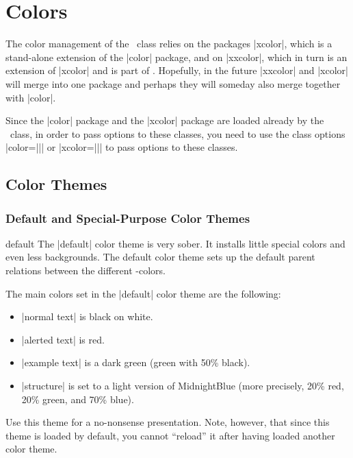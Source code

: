 %

\section{Colors}

\label{section-colors}


The color management of the \beamer\ class relies on the packages
|xcolor|, which is a stand-alone extension of the |color| package, 
and on |xxcolor|, which in turn is an extension of
|xcolor| and is part of \pgf. Hopefully, in the future |xxcolor| and
|xcolor| will merge into one package and perhaps they will
someday also merge together with |color|.

Since the |color| package and the |xcolor| package are loaded already
by the \beamer\ class, in order to pass options to these classes, you
need to use the class options |color={||}| or
|xcolor={||}| to pass options to these
classes.




\subsection{Color Themes}

\subsubsection{Default and Special-Purpose Color Themes}

\begin{colorthemeexample}{default}
  The |default| color theme is very sober. It installs little special
  colors and even less backgrounds. The default color theme sets up
  the default parent relations between the different \beamer-colors.

  The main colors set in the |default| color theme are the following: 
  \begin{itemize}
  \item
    |normal text| is black on white.
  \item
    |alerted text| is red.
  \item
    |example text| is a dark green (green with 50\% black).
  \item
    |structure| is set to a light version of MidnightBlue
    (more precisely, 20\% red, 20\% green, and 70\% blue).  
  \end{itemize}
  Use this theme for a no-nonsense presentation. Note, however, that
  since this theme is loaded by default, you cannot ``reload'' it
  after having loaded another color theme.
\end{colorthemeexample}

